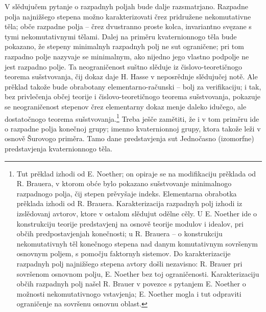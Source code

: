 \documentclass[11pt]{article}
\begin{document}
\setcounter{footnote}{0}

\noindent V slědujučem pytanje o razpadnyh poljah bude dalje razsmatrjano. Razpadne polja najnižšego stepena možno karakterizovati črez pridružene nekomutativne těla; obče razpadne polja -- črez dvustranno proste kolca, invariantno svęzane s tymi nekomutativnymi tělami. Dalej na priměru kvaternionnogo těla bude pokazano, že stepeny minimalnyh razpadnyh polj ne sut ograničene; pri tom razpadno polje nazyvaje se minimalnym, ako nijedno jego vlastno podpolje ne jest razpadno polje. Ta neograničenost suštno slěduje iz čislovo-teoretičnogo teorema sušstvovanja, čij dokaz daje H. Hasse v neposrědnje slědujučej notě. Ale prěklad takože bude obrabotany elementarno-računski -- bolj za verifikaciju; i tak, bez privlečenja občej teorije i čislovo-teoretičnogo teorema sušstvovanja, pokazuje se neograničenost stepenov črez elementarny dokaz menje daleko idučego, ale dostatočnogo teorema sušstvovanja.\footnote{Tut prěklad izhodi od E. Noether; on opiraje se na modifikaciju prěklada od R. Brauera, v ktorom obće bylo pokazano sušstvovanje minimalnogo razpadnogo polja, čij stepen prěvyšaje indeks. Elementarna obrabotka prěklada izhodi od R. Brauera. Karakterizacija razpadnyh polj izhodi iz izslědovanj avtorov, ktore v ostalom slědujut odělne cěly. U E. Noether ide o konstrukciju teorije predstavjenj na osnově teorije modulov i idealov, pri občih predpostavjenjah konečnosti; u R. Brauera -- o konstrukciju nekomutativnyh těl konečnogo stepena nad danym komutativnym sovršenym osnovnym poljem, s pomočju faktornyh sistemov. Do karakterizacije razpadnyh polj najnižšego stepena avtory došli nezavisno: R. Brauer pri sovršenom osnovnom polju, E. Noether bez toj ograničenosti. Karakterizaciju občih razpadnyh polj našel R. Brauer v povezce s pytanjem E. Noether o možnosti nekomutativnogo vstavjenja; E. Noether mogla i tut odpraviti ograničenje na sovršenu osnovnu oblast.} Treba ješče zamětiti, že i v tom priměru ide o razpadne polja konečnoj grupy; imenno kvaternionnoj grupy, ktora takože leži v osnově Šurovogo priměra. Tamo dane predstavjenja sut Jednočasno (izomorfne) predstavjenja kvaternionnogo těla.
\end{document}
